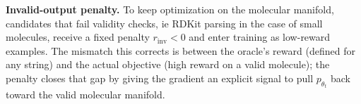 \textbf{Invalid-output penalty.}
To keep optimization on the molecular manifold, candidates that fail validity checks, ie RDKit parsing \citep{rdkit} in the case of small molecules, receive a fixed penalty $r_{\mathrm{inv}}<0$ and enter training as low-reward examples. The mismatch this corrects is between the oracle's reward (defined for any string) and the actual objective (high reward on a valid molecule); the penalty closes that gap by giving the gradient an explicit signal to pull $p_{\theta_t}$ back toward the valid molecular manifold.